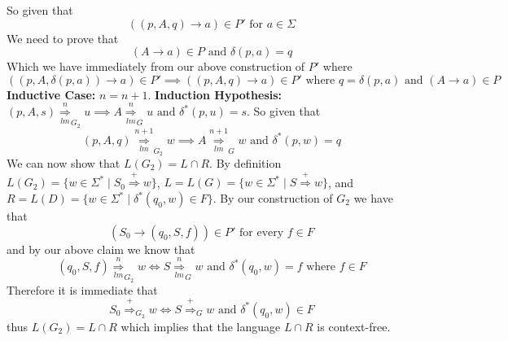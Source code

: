 \documentclass[12pt]{article}
\begin{document}
\medskip \newline
So given that
$$((p,A,q) \rightarrow a) \in P' \text{ for } a\in \Sigma$$
We need to prove that
$$ (A \rightarrow a) \in P \text{ and } \delta(p,a) = q$$
Which we have immediately from our above construction of $P'$ where
$$((p,A,\delta(p,a)) \rightarrow a) \in P' \implies
((p,A,q) \rightarrow a) \in P' \text{ where } q=\delta(p,a) \text{ and }
(A\rightarrow a) \in P$$
\newline \textbf{Inductive Case: } $n = n+1$.
\newline \textbf{Induction Hypothesis: }
$(p,A,s) \underset{lm}{\overset{n}{\Longrightarrow}}_{G_2} u
\implies A \underset{lm}{\overset{n}{\Longrightarrow}}_{G} u
\text{ and } \delta^*(p,u) = s$.
\medskip \newline
So given that
$$(p,A,q) \underset{lm}{\overset{n+1}{\Longrightarrow}}_{G_2} w
\implies A \underset{lm}{\overset{n+1}{\Longrightarrow}}_{G} w
\text{ and } \delta^*(p,w) = q$$
\medskip \newline
\newpage
We can now show that $L(G_2) = L\cap R$. By definition
$L(G_2) = \{w \in \Sigma^* \mid S_0 \overset{+}{\Longrightarrow} w\}$,
$L = L(G) = \{w \in \Sigma^* \mid S \overset{+}{\Longrightarrow} w\}$, and
$R = L(D) = \{w \in \Sigma^* \mid \delta^*(q_0,w) \in F\}$. By our
construction of $G_2$ we have that
$$(S_0 \rightarrow (q_0,S,f)) \in P' \text{ for every } f \in F$$
and by our above claim we know that
$$(q_0,S,f) \underset{lm}{\overset{n}{\Longrightarrow}}_{G_2} w \iff
S \underset{lm}{\overset{n}{\Longrightarrow}}_{G} w
\text{ and } \delta^*(q_0,w) = f \text{ where } f\in F$$
Therefore it is immediate that
$$ S_0 \overset{+}{\Longrightarrow}_{G_2} w \iff
S \overset{+}{\Longrightarrow}_{G} w \text{ and } \delta^*(q_0,w) \in F$$
thus $L(G_2) = L\cap R$ which implies that the language $L\cap R$ is
context-free.
\end{document}
